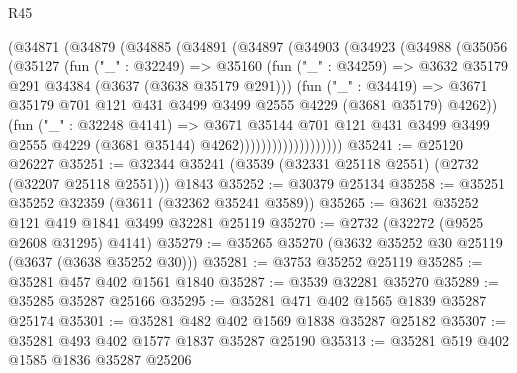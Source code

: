 \begin{lexlean}{R45}
\begin{coremodule}
                    (@34871
                      (@34879
                        (@34885
                          (@34891
                            (@34897
                              (@34903
                                (@34923
                                  (@34988
                                    (@35056
                                      (@35127
                                        (fun ("_" : @32249) =>
                                        @35160
                                          (fun ("_" : @34259) =>
                                          @3632 @35179 @291 @34384 (@3637 (@3638 @35179 @291)))
                                          (fun ("_" : @34419) =>
                                          @3671
                                            @35179
                                            @701
                                            @121
                                            @431
                                            @3499
                                            @3499
                                            @2555
                                            @4229
                                            (@3681 @35179)
                                            @4262))
                                        (fun ("_" : @32248 @4141) =>
                                        @3671
                                          @35144
                                          @701
                                          @121
                                          @431
                                          @3499
                                          @3499
                                          @2555
                                          @4229
                                          (@3681 @35144)
                                          @4262)))))))))))))))))))
@35241 := @25120 @26227
@35251 := @32344 @35241 (@3539 (@32331 @25118 @2551) (@2732 (@32207 @25118 @2551))) @1843
@35252 := @30379 @25134
@35258 := @35251 @35252 @32359 (@3611 (@32362 @35241 @3589))
@35265 := @3621 @35252 @121 @419 @1841 @3499 @32281 @25119
@35270 := @2732 (@32272 (@9525 @2608 @31295) @4141)
@35279 := @35265 @35270 (@3632 @35252 @30 @25119 (@3637 (@3638 @35252 @30)))
@35281 := @3753 @35252 @25119
@35285 := @35281 @457 @402 @1561 @1840
@35287 := @3539 @32281 @35270
@35289 := @35285 @35287 @25166
@35295 := @35281 @471 @402 @1565 @1839 @35287 @25174
@35301 := @35281 @482 @402 @1569 @1838 @35287 @25182
@35307 := @35281 @493 @402 @1577 @1837 @35287 @25190
@35313 := @35281 @519 @402 @1585 @1836 @35287 @25206

\end{coremodule}
\end{lexlean}
